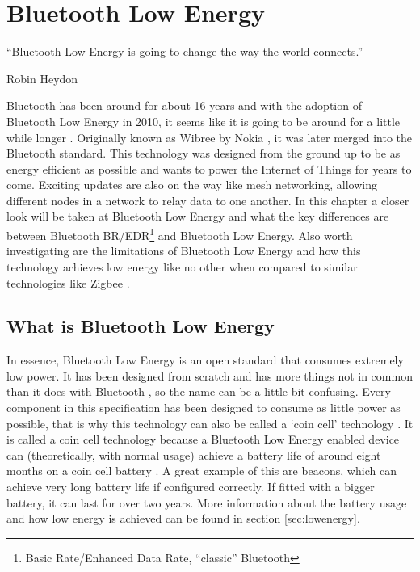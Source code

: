 \documentclass[pdftex,a4paper,12pt,twoside]{report}
\begin{document}
\chapter{Bluetooth Low Energy}
\label{ch:ble}
\epigraph{``Bluetooth Low Energy is going to change the way the world connects.''}{Robin Heydon}
Bluetooth has been around for about 16 years and with the adoption of Bluetooth Low Energy in 2010, it seems like it is going to be around for a little while longer \citep{bluetoothsig2016}. Originally known as Wibree by Nokia \citep{nokia2006}, it was later merged into the Bluetooth standard. This technology was designed from the ground up \citep{gupta2013inside} to be as energy efficient as possible and wants to power the Internet of Things for years to come. Exciting updates are also on the way like mesh networking, allowing different nodes in a network to relay data to one another. In this chapter a closer look will be taken at Bluetooth Low Energy and what the key differences are between Bluetooth BR/EDR\footnote{Basic Rate/Enhanced Data Rate, ``classic'' Bluetooth} and Bluetooth Low Energy. Also worth investigating are the limitations of Bluetooth Low Energy and how this technology achieves low energy like no other when compared to similar technologies like Zigbee \citep{siekkinen2012low}.

\section{What is Bluetooth Low Energy}
\label{sec:whatis}
In essence, Bluetooth Low Energy is an open standard that consumes extremely low power. It has been designed from scratch and has more things not in common than it does with Bluetooth \citep{heydon2012bluetooth}, so the name can be a little bit confusing. Every component in this specification has been designed to consume as little power as possible, that is why this technology can also be called a `coin cell' technology \citep{bluetooth2016training}. It is called a coin cell technology because a Bluetooth Low Energy enabled device can (theoretically, with normal usage) achieve a battery life of around eight months on a coin cell battery \citep{kamath2010measuring}. A great example of this are beacons, which can achieve very long battery life if configured correctly. If fitted with a bigger battery, it can last for over two years. More information about the battery usage and how low energy is achieved can be found in section \ref{sec:lowenergy}.
\end{document}
